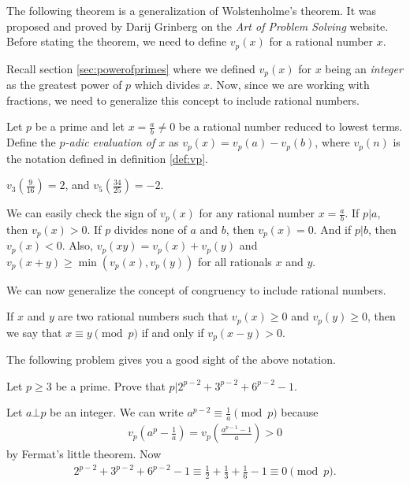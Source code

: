 \documentclass{subfile}
\begin{document}
	The following theorem is a generalization of Wolstenholme's theorem. It was proposed and proved by Darij Grinberg on the \textit{Art of Problem Solving} website. Before stating the theorem, we need to define $v_p(x)$ for a rational number $x$.
	
	Recall section \eqref{sec:powerofprimes} where we defined $v_p(x)$ for $x$ being an \textit{integer} as the greatest power of $p$ which divides $x$. Now, since we are working with fractions, we need to generalize this concept to include rational numbers.
	
	\begin{definition}
		Let $p$ be a prime and let $x = \frac{a}{b} \neq 0$ be a rational number reduced to lowest terms. Define the \textit{$p$-adic evaluation of $x$} as $v_p(x) = v_p(a)-v_p(b)$, where $v_p(n)$ is the notation defined in definition \eqref{def:vp}.
	\end{definition}
	
	\begin{example}
		$v_3\left(\frac{9}{16}\right) = 2$, and $v_5\left(\frac{34}{25}\right) = -2$.
	\end{example}
	
	\begin{note}
		We can easily check the sign of $v_p(x)$ for any rational number $x=\frac{a}{b}$. If $p|a$, then $v_p(x)>0$. If $p$ divides none of $a$ and $b$, then $v_p(x)=0$. And if $p|b$, then $v_p(x)<0$. Also,  $ v_{p}\left(xy\right) = v_{p}\left(x\right) + v_{p}\left(y\right)$ and $ v_{p}\left(x + y\right)\geq\min\left(v_{p}\left(x\right),v_{p}\left(y\right)\right)$ for all rationals $x$ and $y$.
	\end{note}
	
	We can now generalize the concept of congruency to include rational numbers.
	\begin{definition}
		If $x$ and $y$ are two rational numbers such that $ v_{p}\left(x\right)\geq 0$ and $ v_{p}\left(y\right)\geq 0$, then we say that $ x\equiv y\pmod p$ if and only if $ v_{p}\left(x - y\right) > 0$.
	\end{definition}
	
	The following problem gives you a good sight of the above notation.
	
	\begin{problem}
		Let $p \geq 3$ be a prime. Prove that $p|2^{p-2}+3^{p-2}+6^{p-2}-1$.
	\end{problem}
	
	\begin{solution}
		Let $a \bot p$ be an integer. We can write $a^{p-2} \equiv \frac{1}{a} \pmod p$ because
			\begin{align*}
				v_p\left(a^p - \frac{1}{a}\right)=v_p\left(\frac{a^{p-1}-1}{a}\right)>0
			\end{align*}
		by Fermat's little theorem. Now
		\begin{align*}
		2^{p-2}+3^{p-2}+6^{p-2}-1 \equiv \frac{1}{2}+\frac{1}{3}+\frac{1}{6}-1 \equiv 0 \pmod p.
		\end{align*}
	\end{solution}
	
\end{document}
